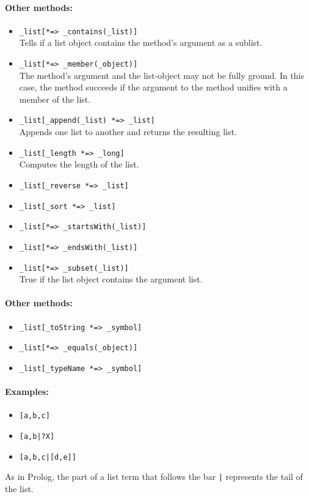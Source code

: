 \documentclass[11pt]{article}
\begin{document}
\paragraph{Other methods:}
\begin{itemize}
\item {\tt \_list[*=> \_contains(\_list)]} 
  \\
  Tells if a list object contains the method's argument as a sublist.
\item {\tt \_list[*=> \_member(\_object)]}  
  \\
  The method's argument and the list-object may not be fully ground. In this
  case, the method succeeds if the argument to the method unifies with a
  member of the list.
\item {\tt \_list[\_append(\_list) *=> \_list]}  \\
  Appends one list to another and returns the resulting list.
\item {\tt \_list[\_length *=> \_long]}  
  \\
  Computes the length of the list.
\item {\tt \_list[\_reverse *=> \_list]}  
\item {\tt \_list[\_sort *=> \_list]}  
\item {\tt \_list[*=> \_startsWith(\_list)]}  
\item {\tt \_list[*=> \_endsWith(\_list)]}  
\item {\tt \_list[*=> \_subset(\_list)]}  
  \\
  True if the list object contains the argument list.
\end{itemize}

\paragraph{Other methods:}
\begin{itemize}
\item {\tt \_list[\_toString *=> \_symbol]}  
\item {\tt \_list[*=> \_equals(\_object)]}  
\item {\tt \_list[\_typeName *=> \_symbol]}  
\end{itemize}

\paragraph{Examples:}
\begin{itemize}
\item {\tt [a,b,c]} 
\item {\tt [a,b|?X]}  
\item {\tt [a,b,c|[d,e]]} 
\end{itemize}
As in Prolog, the part of a list term that follows the bar \verb,|,
represents the tail of the list.
\end{document}
